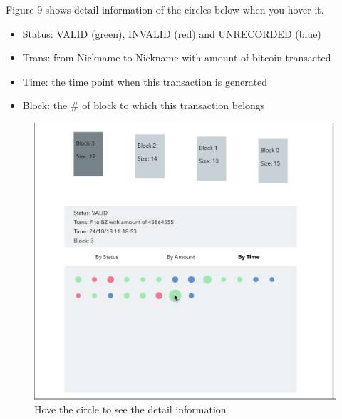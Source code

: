 \documentclass[journal, a4paper]{IEEEtran}
\begin{document}
Figure 9 shows detail information of the circles below when you hover it.
\begin{itemize}
    \item Status: VALID (green), INVALID (red) and UNRECORDED (blue)
    \item Trans: from Nickname to Nickname with amount of bitcoin transacted
    \item Time: the time point when this transaction is generated
    \item Block: the \# of block to which this transaction belongs
\end{itemize}
\begin{figure}[!hbt]
		\begin{center}
		\includegraphics[width=\columnwidth]{block_hover.png}
		\caption{Hove the circle to see the detail information}
		\label{fig:block_hover}
		\end{center}
	\end{figure}
\end{document}
